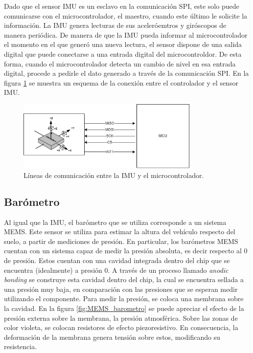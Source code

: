 Dado que el sensor IMU es un esclavo en la comunicación SPI, este solo puede comunicarse con el microcontrolador, el maestro, cuando este último le solicite la información. La IMU genera lecturas de sus aceleróemtros y giróscopos de manera periódica. De manera de que la IMU pueda informar al microcontrolador el momento en el que generó una nueva lectura, el sensor dispone de una salida digital que puede conectarse a una entrada digital del microcontroldor. De esta forma, cuando el microcontrolador detecta un cambio de nivel en esa entrada digital, procede a pedirle el dato generado a través de la comunicación SPI. En la figura \ref{fig:IMU_SPI} se muestra un esquema de la conexión entre el controlador y el sensor IMU.

\begin{figure}[H]
    \centering
    \includegraphics[width=0.8\textwidth]{img/IMU_SPI.png}
    \caption{Líneas de comunicación entre la IMU y el microcontrolador.}
    \label{fig:IMU_SPI}    
\end{figure}

\subsection{Barómetro}

Al igual que la IMU, el barómetro que se utiliza corresponde a un sistema MEMS. Este sensor se utiliza para estimar la altura del vehículo respecto del suelo, a partir de mediciones de presión. En particular, los barómetros MEMS cuentan con un sistema capaz de medir la presión absoluta, es decir respecto al 0 de presión. Estos cuentan con una cavidad integrada dentro del chip que se encuentra (idealmente) a presión 0. A través de un proceso llamado \textit{anodic bonding} \cite{baro_1}\cite{baro_2} se construye esta cavidad dentro del chip, la cual se encuentra sellada a una presión muy baja, en comparación con las presiones que se esperan medir utilizando el componente. Para medir la presión, se coloca una membrana sobre la cavidad. En la figura \ref{fig:MEMS_barometro} se puede apreciar el efecto de la presión externa sobre la membrana, la presión atmosférica. Sobre las zonas de color violeta, se colocan resistores de efecto piezoresistivo. En consecuencia, la deformación de la membrana genera tensión sobre estos, modificando su resistencia.

